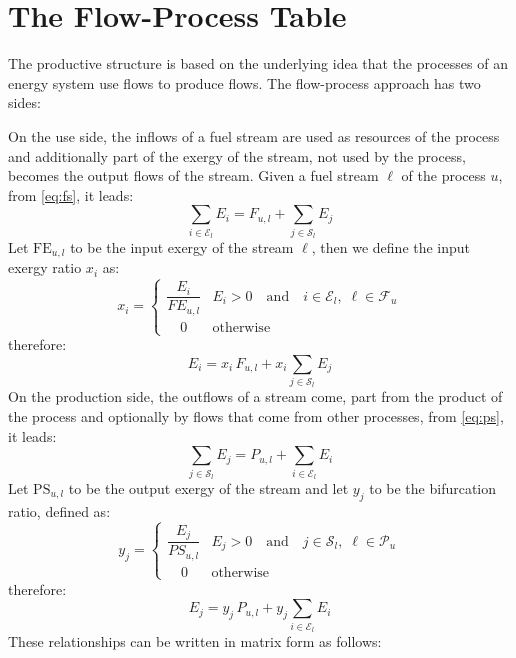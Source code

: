 \documentclass{ecos2018}
\begin{document}
\section{The Flow-Process Table}
The productive structure is based on the underlying idea that the processes of an energy system use flows to produce flows. The flow-process approach has two sides:

On the use side, the inflows of a fuel stream are used as resources of the process and additionally part of the exergy of the stream, not used by the process, becomes the output flows of the stream. Given a fuel stream $\ell$ of the process $u$, from \cref{eq:fs}, it leads:
\begin{equation}
\sum_{i\in\mathcal{E}_l} E_i = F_{u,l} + \sum_{j\in\mathcal{S}_l} E_j
\end{equation}
Let $\mathrm{FE}_{u,l}$ to be the input exergy of the stream $\ell$, then we define the input exergy ratio $x_i$ as:
\begin{equation}
x_i=\begin{cases}
\dfrac{E_i}{FE_{u,l}}& E_i>0 \quad \text{and} \quad i\in\mathcal{E}_l,\; \ell\in\mathcal{F}_u \\[1em]
\quad0&\text{otherwise}
\end{cases}
\end{equation}
therefore:
\begin{equation}
E_i = x_i \, F_{u,l} + x_i\sum_{j\in\mathcal{S}_l} E_j
\end{equation}
On the production side, the outflows of a stream come, part from the product of the process and optionally by flows that come from other processes, from \cref{eq:ps}, it leads:
\begin{equation}
\sum_{j\in\mathcal{S}_l} E_j = P_{u,l} + \sum_{i\in\mathcal{E}_l} E_i
\end{equation}
Let $\mathrm{PS}_{u,l}$ to be the output exergy of the stream and let $y_j$ to be the bifurcation ratio, defined as:
\begin{equation}
y_j=\begin{cases}
\dfrac{E_j}{PS_{u,l}}& E_j>0 \quad \text{and} \quad j\in\mathcal{S}_l,\; \ell\in\mathcal{P}_u \\[1em]
\quad0&\text{otherwise}
\end{cases}
\end{equation}
therefore:
\begin{equation}
E_j = y_j \, P_{u,l} + y_j\sum_{i\in\mathcal{E}_l} E_i
\end{equation}
These relationships can be written in matrix form as follows:
\end{document}
